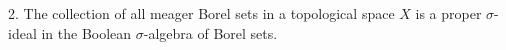 2. The collection of all meager Borel sets in a topological space $X$ is a proper $\sigma$-ideal in the Boolean $\sigma$-algebra of Borel sets.
